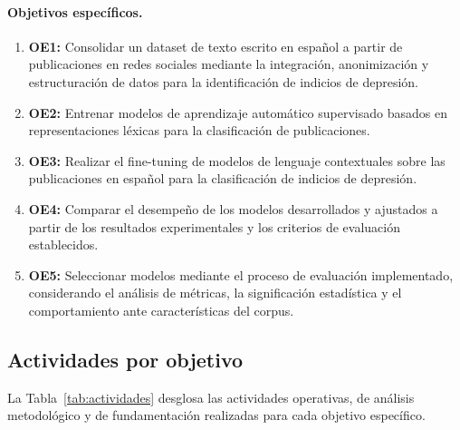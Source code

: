 \documentclass[12pt,a4paper]{article}
\begin{document}
\paragraph{Objetivos específicos.}
\begin{enumerate}[leftmargin=2.5em]
    \item \textbf{OE1:} Consolidar un dataset de texto escrito en español a partir de publicaciones en redes sociales mediante la integración, anonimización y estructuración de datos para la identificación de indicios de depresión.
    \item \textbf{OE2:} Entrenar modelos de aprendizaje automático supervisado basados en representaciones léxicas para la clasificación de publicaciones.
    \item \textbf{OE3:} Realizar el fine-tuning de modelos de lenguaje contextuales sobre las publicaciones en español para la clasificación de indicios de depresión.
    \item \textbf{OE4:} Comparar el desempeño de los modelos desarrollados y ajustados a partir de los resultados experimentales y los criterios de evaluación establecidos.
    \item \textbf{OE5:} Seleccionar modelos mediante el proceso de evaluación implementado, considerando el análisis de métricas, la significación estadística y el comportamiento ante características del corpus.
\end{enumerate}

\subsection{Actividades por objetivo}
\label{sec:actividades}
La Tabla~\ref{tab:actividades} desglosa las actividades operativas, de análisis metodológico y de fundamentación realizadas para cada objetivo específico.
\end{document}
